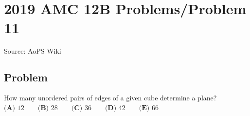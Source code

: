 \documentclass[12pt]{article}
\begin{document}
\section*{{2019 AMC 12B Problems/Problem 11}}
Source: AoPS Wiki

\subsection*{Problem}
How many unordered pairs of edges of a given cube determine a plane? $\textbf{(A) } 12 \qquad \textbf{(B) } 28 \qquad \textbf{(C) } 36\qquad \textbf{(D) } 42 \qquad \textbf{(E) } 66$
\end{document}
